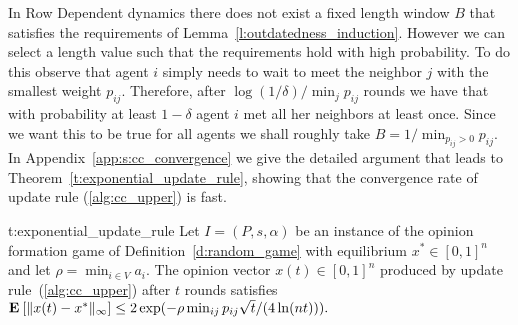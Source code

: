In Row Dependent dynamics there does not exist a fixed length window $B$
that satisfies the requirements of Lemma~\ref{l:outdatedness_induction}.
However we can select a length value such that the requirements hold with high probability.
To do this observe that agent $i$ simply needs to wait to meet the neighbor
$j$ with the smallest weight $p_{ij}$. Therefore, after
$\log(1/\delta)/\min_{j} p_{ij}$ rounds we have that with probability at least
$1-\delta$ agent $i$ met all her neighbors at least once.
Since we want this to be true for all agents
we shall roughly take $B = 1/\min_{p_{ij} > 0} {p_{ij}}$.
In Appendix~\ref{app:s:cc_convergence} we give the detailed
argument that leads to Theorem~\ref{t:exponential_update_rule},
showing that the convergence rate of update rule (\ref{alg:cc_upper}) is fast.

\begin{reptheorem}{t:exponential_update_rule}
  Let $I = (P,s, \alpha)$ be an instance of the opinion formation
  game of Definition~\ref{d:random_game} with equilibrium
  $x^* \in [0,1]^n$ and let $\rho = \min_{i \in V} a_i$.
  The opinion vector $x(t)\in[0,1]^n$ produced by
  update rule~(\ref{alg:cc_upper}) after $t$ rounds satisfies
  \(
    \Exp{\norm{\infty}{x(t) - x^*}}
    \leq
    2\exp(- \rho  \min_{ij} p_{ij} \sqrt{t}/(4\ln(nt)) ).
  \)
\end{reptheorem}
